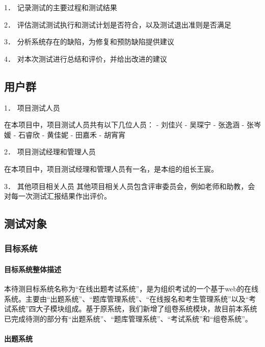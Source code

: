 \documentclass[hyperref, a4paper]{ctexart}
\let\oldparagraph\paragraph
\renewcommand{\paragraph}[1]{\oldparagraph{#1}\mbox{}}
\begin{document}
1． 记录测试的主要过程和测试结果

2． 评估测试测试执行和测试计划是否符合，以及测试退出准则是否满足

3． 分析系统存在的缺陷，为修复和预防缺陷提供建议

4． 对本次测试进行总结和评价，并给出改进的建议

\hypertarget{ux7528ux6237ux7fa4}{%
\subsection{用户群}\label{ux7528ux6237ux7fa4}}

1． 项目测试人员

在本项目中，项目测试人员共有以下几位人员： - 刘佳兴 - 吴琛宁 - 张逸涵 -
张岑媛 - 石睿欣 - 黄佳妮 - 田嘉禾 - 胡宵宵

2． 项目测试经理和管理人员

在本项目中，项目测试经理和管理人员有一名，是本组的组长王宸。

3． 其他项目相关人员
其他项目相关人员包含评审委员会，例如老师和助教，会对每一次测试汇报结果作出评价。

\hypertarget{ux6d4bux8bd5ux5bf9ux8c61}{%
\subsection{测试对象}\label{ux6d4bux8bd5ux5bf9ux8c61}}

\hypertarget{ux76eeux6807ux7cfbux7edf}{%
\subsubsection{目标系统}\label{ux76eeux6807ux7cfbux7edf}}

\hypertarget{ux76eeux6807ux7cfbux7edfux6574ux4f53ux63cfux8ff0}{%
\paragraph{目标系统整体描述}\label{ux76eeux6807ux7cfbux7edfux6574ux4f53ux63cfux8ff0}}

本待测目标系统名称为``在线出题考试系统''，是为组织考试的一个基于web的在线系统。主要由``出题系统''、``题库管理系统''、``在线报名和考生管理系统''以及``考试系统''四大子模块组成。基于原系统，我们新增了组卷系统模块，故目前本系统已完成待测的部分有``出题系统''、``题库管理系统''、``考试系统''和``组卷系统''。

\hypertarget{ux51faux9898ux7cfbux7edf}{%
\paragraph{出题系统}\label{ux51faux9898ux7cfbux7edf}}
\end{document}
